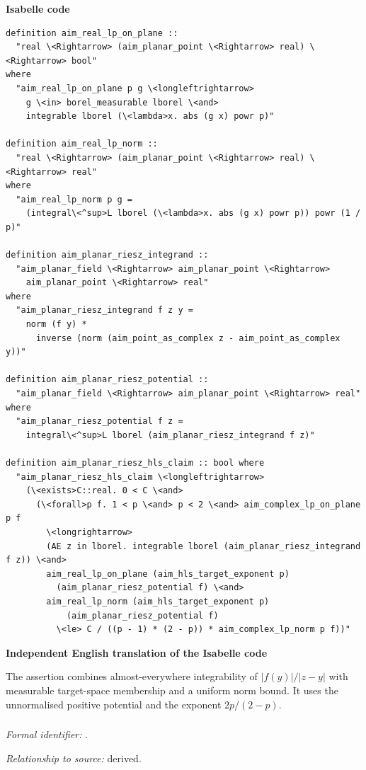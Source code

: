 \documentclass[10pt,oneside]{article}
\newcommand{\reviewlabel}[1]{\par\smallskip\noindent\textsf{\bfseries #1}\par\smallskip}
\begin{document}
\reviewlabel{Isabelle code}
\begin{lstlisting}
definition aim_real_lp_on_plane ::
  "real \<Rightarrow> (aim_planar_point \<Rightarrow> real) \<Rightarrow> bool"
where
  "aim_real_lp_on_plane p g \<longleftrightarrow>
    g \<in> borel_measurable lborel \<and>
    integrable lborel (\<lambda>x. abs (g x) powr p)"

definition aim_real_lp_norm ::
  "real \<Rightarrow> (aim_planar_point \<Rightarrow> real) \<Rightarrow> real"
where
  "aim_real_lp_norm p g =
    (integral\<^sup>L lborel (\<lambda>x. abs (g x) powr p)) powr (1 / p)"

definition aim_planar_riesz_integrand ::
  "aim_planar_field \<Rightarrow> aim_planar_point \<Rightarrow>
    aim_planar_point \<Rightarrow> real"
where
  "aim_planar_riesz_integrand f z y =
    norm (f y) *
      inverse (norm (aim_point_as_complex z - aim_point_as_complex y))"

definition aim_planar_riesz_potential ::
  "aim_planar_field \<Rightarrow> aim_planar_point \<Rightarrow> real"
where
  "aim_planar_riesz_potential f z =
    integral\<^sup>L lborel (aim_planar_riesz_integrand f z)"

definition aim_planar_riesz_hls_claim :: bool where
  "aim_planar_riesz_hls_claim \<longleftrightarrow>
    (\<exists>C::real. 0 < C \<and>
      (\<forall>p f. 1 < p \<and> p < 2 \<and> aim_complex_lp_on_plane p f
        \<longrightarrow>
        (AE z in lborel. integrable lborel (aim_planar_riesz_integrand f z)) \<and>
        aim_real_lp_on_plane (aim_hls_target_exponent p)
          (aim_planar_riesz_potential f) \<and>
        aim_real_lp_norm (aim_hls_target_exponent p)
            (aim_planar_riesz_potential f)
          \<le> C / ((p - 1) * (2 - p)) * aim_complex_lp_norm p f))"
\end{lstlisting}

\reviewlabel{Independent English translation of the Isabelle code}
The assertion combines almost-everywhere integrability of $|f(y)|/|z-y|$ with measurable target-space membership and a uniform norm bound. It uses the unnormalised positive potential and the exponent $2p/(2-p)$.

\subsubsection{\texttt{}}
\noindent\textit{Formal identifier:} \texttt{}.\par
\noindent\textit{Relationship to source:} derived.
\end{document}
